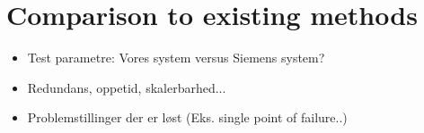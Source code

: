 \chapter{Comparison to existing methods}

\begin{itemize}
\item Test parametre: Vores system versus Siemens system?
\item Redundans, oppetid, skalerbarhed...
\item Problemstillinger der er løst (Eks. single point of failure..)
\end{itemize}